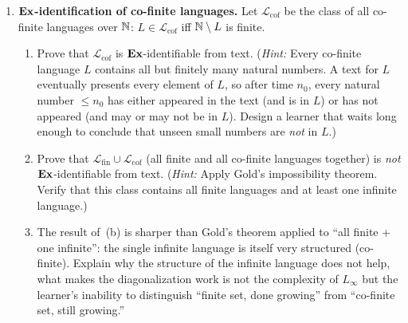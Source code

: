 \begin{enumerate}[leftmargin=*,itemsep=6pt]
\item \textbf{$\mathbf{Ex}$-identification of co-finite languages.}
  Let $\mathcal{L}_{\mathrm{cof}}$ be the class of all co-finite
  languages over $\mathbb{N}$: $L \in \mathcal{L}_{\mathrm{cof}}$ iff
  $\mathbb{N} \setminus L$ is finite.
  \begin{enumerate}[label=(\alph*)]
  \item Prove that $\mathcal{L}_{\mathrm{cof}}$ is
    $\mathbf{Ex}$-identifiable from text.  (\emph{Hint:} Every co-finite
    language $L$ contains all but finitely many natural numbers.
    A text for $L$ eventually presents every element of $L$, so after
    time $n_0$, every natural number $\leq n_0$ has either appeared
    in the text (and is in $L$) or has not appeared (and may or
    may not be in $L$).  Design a learner that waits long enough
    to conclude that unseen small numbers are \emph{not} in $L$.)
  \item Prove that $\mathcal{L}_{\mathrm{fin}} \cup
    \mathcal{L}_{\mathrm{cof}}$ (all finite and all co-finite
    languages together) is \emph{not} $\mathbf{Ex}$-identifiable from text.
    (\emph{Hint:} Apply Gold's impossibility theorem.  Verify
    that this class contains all finite languages and at least one
    infinite language.)
  \item The result of~(b) is sharper than Gold's theorem applied
    to ``all finite + one infinite'': the single infinite language
    is itself very structured (co-finite).  Explain why the structure
    of the infinite language does not help, what makes the
    diagonalization work is not the complexity of $L_\infty$ but
    the learner's inability to distinguish ``finite set, done
    growing'' from ``co-finite set, still growing.''
  \end{enumerate}

\end{enumerate}

